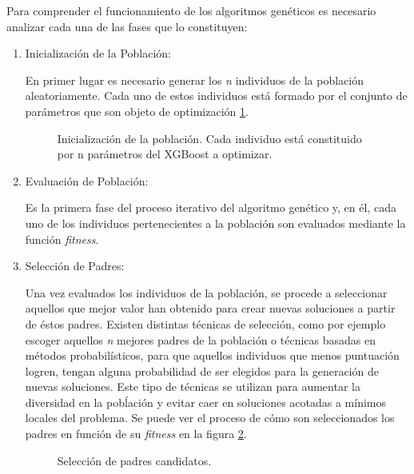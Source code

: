             Para comprender el funcionamiento de los algoritmos genéticos es necesario analizar cada una de las fases que lo constituyen:
            
            \begin{enumerate}
                \item Inicialización de la Población:

                        En primer lugar es necesario generar los \textit{n} individuos de la población aleatoriamente. Cada uno de estos individuos está formado por el conjunto de parámetros que son objeto de optimización \ref{InitialPopulation}.

                        \begin{figure}[h]
                            \centering
                            
                            \caption{Inicialización de la población. Cada individuo está constituido por n parámetros del XGBoost a optimizar.}
                            \label{InitialPopulation}
                        \end{figure}

                \item Evaluación de Población:

                        Es la primera fase del proceso iterativo del algoritmo genético y, en él, cada uno de los individuos pertenecientes a la población son evaluados mediante la función \textit{fitness}.

                \item Selección de Padres:

                        Una vez evaluados los individuos de la población, se procede a seleccionar aquellos que mejor valor han obtenido para crear nuevas soluciones a partir de éstos padres. Existen distintas técnicas de selección, como por ejemplo escoger aquellos \textit{n} mejores padres de la población o técnicas basadas en métodos probabilísticos, para que aquellos individuos que menos puntuación logren, tengan alguna probabilidad de ser elegidos para la generación de nuevas soluciones. Este tipo de técnicas se utilizan para aumentar la diversidad en la pobĺación y evitar caer en soluciones acotadas a mínimos locales del problema. Se puede ver el proceso de cómo son seleccionados los padres en función de su \textit{fitness} en la figura \ref{FitnessFunction}.

                        \begin{figure}[h]
                            \centering
                            
                            \caption{Selección de padres candidatos.}
                            \label{FitnessFunction}
                        \end{figure}


\end{enumerate}
